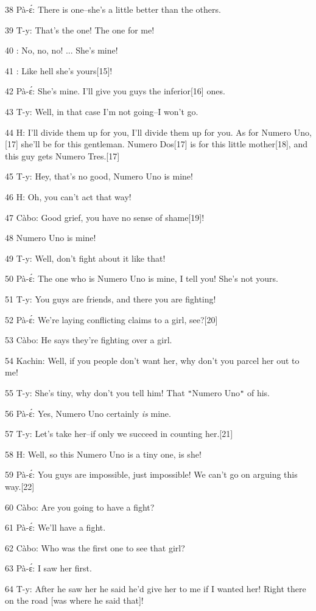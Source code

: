 38 Pà-ɛ́: There is one--she's a little better than the others.

39 T-y: That's the one! The one for me!

40       : No, no, no! ... She's mine!

41       : Like hell she's yours[15]!

42 Pà-ɛ́: She's mine. I'll give you guys the inferior[16] ones.

43 T-y: Well, in that case I'm not going--I won't go.

44 H: I'll divide them up for you, I'll divide them up for you. As for Numero Uno,[17]
she'll be for this gentleman. Numero Dos[17] is for this little mother[18], and
this guy gets Numero Tres.[17]

45 T-y: Hey, that's no good, Numero Uno is mine!

46 H: Oh, you can't act that way!

47 Càbo: Good grief, you have no sense of shame[19]!

48             Numero Uno is mine!

49 T-y: Well, don't fight about it like that!

50 Pà-ɛ́: The one who is Numero Uno is mine, I tell you! She's not yours.

51 T-y: You guys are friends, and there you are fighting!

52 Pà-ɛ́: We're laying conflicting claims to a girl, see?[20]

53 Càbo: He says they're fighting over a girl.

54 Kachin: Well, if you people don't want her, why don't you parcel her out to
me!

55 T-y: She's tiny, why don't you tell him! That \texttt{"}Numero Uno\texttt{"}
of his.

56 Pà-ɛ́: Yes, Numero Uno certainly\textit{ is} mine.

57 T-y: Let's take her--if only we succeed in counting her.[21]

58 H: Well, so this Numero Uno is a tiny one, is she!

59 Pà-ɛ́: You guys are impossible, just impossible! We can't go on arguing this
way.[22]

60 Càbo: Are you going to have a fight?

61 Pà-ɛ́: We'll have a fight.

62 Càbo: Who was the first one to see that girl?

63 Pà-ɛ́: I saw her first.

64 T-y: After he saw her he said he'd give her to me if I wanted her! Right there
on the road [was where he said that]!

